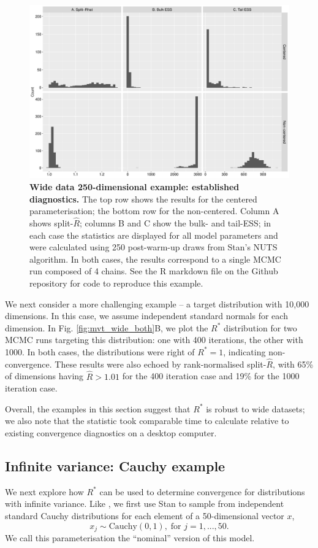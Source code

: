 \documentclass{article}
\begin{document}
\begin{figure}[!htb]
	\centerline{\includegraphics[width=1\textwidth]{../output/wide_both_diagnostics.pdf}}
	\caption{\textbf{Wide data 250-dimensional example: established diagnostics.} The top row shows the results for the centered parameterisation; the bottom row for the non-centered. Column A shows split-$\widehat{R}$; columns B and C show the bulk- and tail-ESS; in each case the statistics are displayed for all model parameters and were calculated using 250 post-warm-up draws from Stan's NUTS algorithm. In both cases, the results correspond to a single MCMC run composed of 4 chains. See the R markdown file on the Github repository for code to reproduce this example.}
	\label{fig:wide_both_diagnostics}
\end{figure}

We next consider a more challenging example -- a target distribution with 10,000 dimensions. In this case, we assume independent standard normals for each dimension. In Fig. \ref{fig:mvt_wide_both}B, we plot the $R^*$ distribution for two MCMC runs targeting this distribution: one with 400 iterations, the other with 1000. In both cases, the distributions were right of $R^*=1$, indicating non-convergence. These results were also echoed by rank-normalised split-$\widehat{R}$, with 65\% of dimensions having $\widehat{R}>1.01$ for the 400 iteration case and 19\% for the 1000 iteration case.

Overall, the examples in this section suggest that $R^*$ is robust to wide datasets; we also note that the statistic took comparable time to calculate relative to existing convergence diagnostics on a desktop computer.

\subsection{Infinite variance: Cauchy example}
We next explore how $R^*$ can be used to determine convergence for distributions with infinite variance. Like \cite{vehtari2019rank}, we first use Stan to sample from independent standard Cauchy distributions for each element of a 50-dimensional vector $x$,
%
\begin{equation}
x_j\sim \text{Cauchy}(0, 1),\; \text{for } j=1,...,50.
\end{equation}
%
We call this parameterisation the ``nominal'' version of this model.
\end{document}
